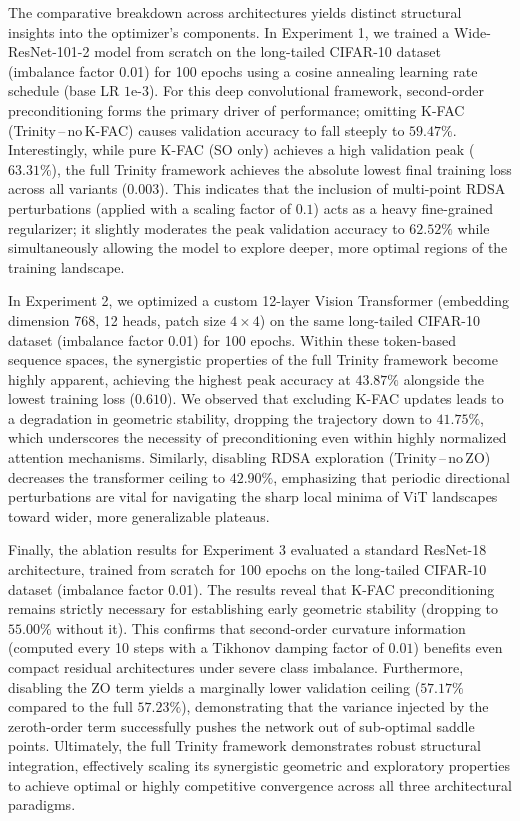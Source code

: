 \documentclass[conference]{IEEEtran}
\begin{document}
The comparative breakdown across architectures yields distinct structural insights into the optimizer's components. In Experiment 1, we trained a Wide-ResNet-101-2 model from scratch on the long-tailed CIFAR-10 dataset (imbalance factor 0.01) for 100 epochs using a cosine annealing learning rate schedule (base LR $1\text{e-}3$). For this deep convolutional framework, second-order preconditioning forms the primary driver of performance; omitting K-FAC (Trinity\,--\,no\,K-FAC) causes validation accuracy to fall steeply to $59.47\%$. Interestingly, while pure K-FAC (SO only) achieves a high validation peak ($63.31\%$), the full Trinity framework achieves the absolute lowest final training loss across all variants ($0.003$). This indicates that the inclusion of multi-point RDSA perturbations (applied with a scaling factor of $0.1$) acts as a heavy fine-grained regularizer; it slightly moderates the peak validation accuracy to $62.52\%$ while simultaneously allowing the model to explore deeper, more optimal regions of the training landscape.

In Experiment 2, we optimized a custom 12-layer Vision Transformer (embedding dimension 768, 12 heads, patch size $4\times4$) on the same long-tailed CIFAR-10 dataset (imbalance factor 0.01) for 100 epochs. Within these token-based sequence spaces, the synergistic properties of the full Trinity framework become highly apparent, achieving the highest peak accuracy at $43.87\%$ alongside the lowest training loss ($0.610$). We observed that excluding K-FAC updates leads to a degradation in geometric stability, dropping the trajectory down to $41.75\%$, which underscores the necessity of preconditioning even within highly normalized attention mechanisms. Similarly, disabling RDSA exploration (Trinity\,--\,no\,ZO) decreases the transformer ceiling to $42.90\%$, emphasizing that periodic directional perturbations are vital for navigating the sharp local minima of ViT landscapes toward wider, more generalizable plateaus.

Finally, the ablation results for Experiment 3 evaluated a standard ResNet-18 architecture, trained from scratch for 100 epochs on the long-tailed CIFAR-10 dataset (imbalance factor 0.01). The results reveal that K-FAC preconditioning remains strictly necessary for establishing early geometric stability (dropping to $55.00\%$ without it). This confirms that second-order curvature information (computed every 10 steps with a Tikhonov damping factor of $0.01$) benefits even compact residual architectures under severe class imbalance. Furthermore, disabling the ZO term yields a marginally lower validation ceiling ($57.17\%$ compared to the full $57.23\%$), demonstrating that the variance injected by the zeroth-order term successfully pushes the network out of sub-optimal saddle points. Ultimately, the full Trinity framework demonstrates robust structural integration, effectively scaling its synergistic geometric and exploratory properties to achieve optimal or highly competitive convergence across all three architectural paradigms.
\end{document}
